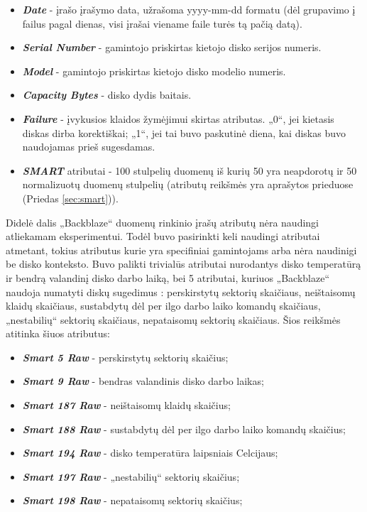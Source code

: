 \documentclass{VUMIFPSkursinis}
\begin{document}
\begin{itemize}
\item \textit{\textbf{Date}} - įrašo įrašymo data, užrašoma yyyy-mm-dd formatu (dėl grupavimo į failus pagal dienas, visi įrašai viename faile turės tą pačią datą).
\item \textit{\textbf{Serial Number}} - gamintojo priskirtas kietojo disko serijos numeris.
\item \textit{\textbf{Model}} - gamintojo priskirtas kietojo disko modelio numeris.
\item \textit{\textbf{Capacity Bytes}} - disko dydis baitais.
\item \textit{\textbf{Failure}} - įvykusios klaidos žymėjimui skirtas atributas. „0“, jei kietasis diskas dirba korektiškai; „1“, jei tai buvo paskutinė diena, kai diskas buvo naudojamas prieš sugesdamas.
\item \textit{\textbf{SMART}} atributai - 100 stulpelių duomenų iš kurių 50 yra neapdorotų ir 50 normalizuotų duomenų stulpelių (atributų reikšmės yra aprašytos prieduose (Priedas \ref{sec:smart})).
\end{itemize}

Didelė dalis „Backblaze“ duomenų rinkinio įrašų atributų nėra naudingi atliekamam eksperimentui. Todėl buvo pasirinkti keli naudingi atributai atmetant, tokius atributus kurie yra specifiniai gamintojams arba nėra naudinigi be disko konteksto. Buvo palikti trivialūs atributai nurodantys disko temperatūrą ir bendrą valandinį disko darbo laiką, bei 5 atributai, kuriuos „Backblaze“ naudoja numatyti diskų sugedimus \cite{backblaze_failure}: perskirstytų sektorių skaičiaus, neištaisomų klaidų skaičiaus, sustabdytų dėl per ilgo darbo laiko komandų skaičiaus, „nestabilių“ sektorių skaičiaus, nepataisomų sektorių skaičiaus. Šios reikšmės atitinka šiuos atributus:
\begin{itemize}
\item \textit{\textbf{Smart 5 Raw}} - perskirstytų sektorių skaičius;
\item \textit{\textbf{Smart 9 Raw}} - bendras valandinis disko darbo laikas;
\item \textit{\textbf{Smart 187 Raw}} - neištaisomų klaidų skaičius;
\item \textit{\textbf{Smart 188 Raw}} - sustabdytų dėl per ilgo darbo laiko komandų skaičius;
\item \textit{\textbf{Smart 194 Raw}} - disko temperatūra laipsniais Celcijaus;
\item \textit{\textbf{Smart 197 Raw}} - „nestabilių“ sektorių skaičius;
\item \textit{\textbf{Smart 198 Raw}} - nepataisomų sektorių skaičius;
\end{itemize}
\end{document}
